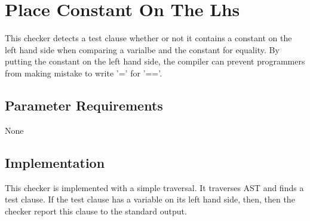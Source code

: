 %
%

\section{Place Constant On The Lhs}
\label{PlaceConstantOnTheLhs::overview}
	 
This checker detects a test clause whether or not it contains a constant on the left hand side when comparing a varialbe and the constant for equality. By putting the constant on the left hand side, the compiler can prevent programmers from making mistake to write '=' for '=='. 

\subsection{Parameter Requirements}

None

\subsection{Implementation}

   This checker is implemented with a simple traversal. It traverses AST and finds a test clause. If the test clause has a variable on its left hand side, then, then the checker report this clause to the standard output.

